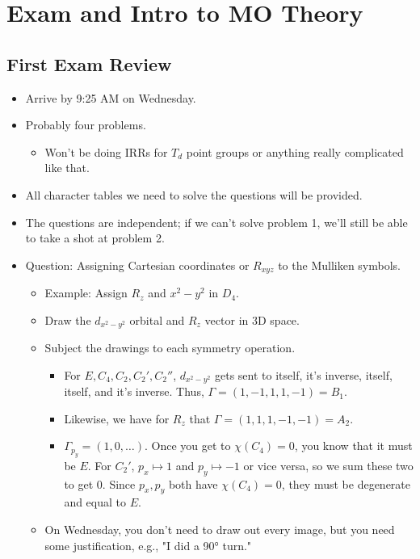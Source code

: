 \documentclass[../notes.tex]{subfiles}
\begin{document}
\chapter{Exam and Intro to MO Theory}
\section{First Exam Review}
\begin{itemize}
    \item {}Arrive by 9:25 AM on Wednesday.
    \item Probably four problems.
    \begin{itemize}
        \item Won't be doing IRRs for $T_d$ point groups or anything really complicated like that.
    \end{itemize}
    \item All character tables we need to solve the questions will be provided.
    \item The questions are independent; if we can't solve problem 1, we'll still be able to take a shot at problem 2.
    \item Question: Assigning Cartesian coordinates or $R_{xyz}$ to the Mulliken symbols.
    \begin{itemize}
        \item Example: Assign $R_z$ and $x^2-y^2$ in $D_4$.
        \item Draw the $d_{x^2-y^2}$ orbital and $R_z$ vector in 3D space.
        \item Subject the drawings to each symmetry operation.
        \begin{itemize}
            \item For $E,C_4,C_2,C_2',C_2''$, $d_{x^2-y^2}$ gets sent to itself, it's inverse, itself, itself, and it's inverse. Thus, $\Gamma=(1,-1,1,1,-1)=B_1$.
            \item Likewise, we have for $R_z$ that $\Gamma=(1,1,1,-1,-1)=A_2$.
            \item $\Gamma_{p_y}=(1,0,\dots)$. Once you get to $\chi(C_4)=0$, you know that it must be $E$. For $C_2'$, $p_x\mapsto 1$ and $p_y\mapsto -1$ or vice versa, so we sum these two to get 0. Since $p_x,p_y$ both have $\chi(C_4)=0$, they must be degenerate and equal to $E$.
        \end{itemize}
        \item On Wednesday, you don't need to draw out every image, but you need some justification, e.g., "I did a \ang{90} turn."

\end{itemize}
\end{itemize}
\end{document}
